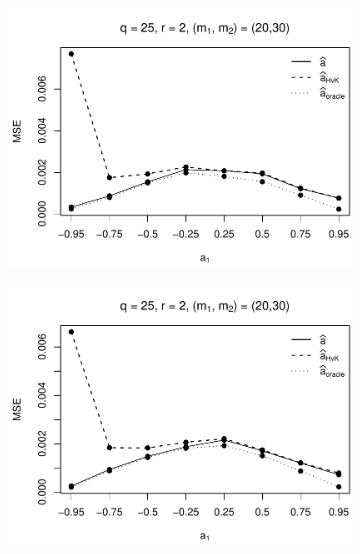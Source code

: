 \begin{figure}[p]
\begin{subfigure}[b]{0.45\textwidth}
\includegraphics[width=\textwidth]{Plots/Robustness/MSE_a1_T=500_slope=1_(q,K1,K2,M1,M2)=(25,2,10,20,30).pdf}
\end{subfigure}
\hspace{0.25cm}
\begin{subfigure}[b]{0.45\textwidth}
\includegraphics[width=\textwidth]{Plots/Robustness/MSE_a1_T=500_slope=1_(q,K1,K2,M1,M2)=(25,2,15,20,30).pdf}
\end{subfigure}


\end{figure}
